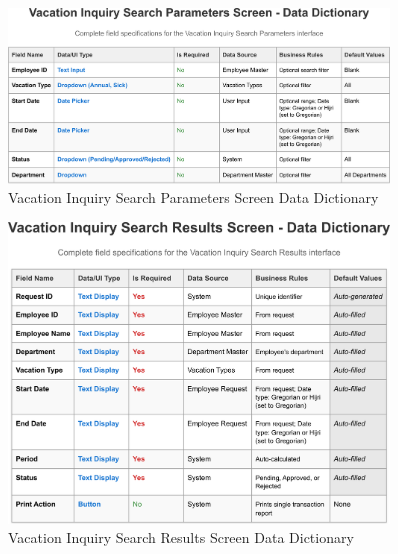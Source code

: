 \documentclass[12pt,a4paper]{article}
\begin{document}
\begin{figure}[H]
\centering
\includegraphics[width=0.9\textwidth]{Data-Dictionary/Screen-Data-Dictionaries/Vacation-Inquiry-Search-Parameters-Screen-Data-Dictionary/Vacation-Inquiry-Search-Parameters-Screen-Data-Dictionary-1.png}
\caption{Vacation Inquiry Search Parameters Screen Data Dictionary}
\label{fig:inquiry-search-params-data-dict}
\end{figure}

\begin{figure}[H]
\centering
\includegraphics[width=0.9\textwidth]{Data-Dictionary/Screen-Data-Dictionaries/Vacation-Inquiry-Search-Results-Screen-Data-Dictionary/Vacation-Inquiry-Search-Results-Screen-Data-Dictionary-1.png}
\caption{Vacation Inquiry Search Results Screen Data Dictionary}
\label{fig:inquiry-search-results-data-dict}
\end{figure}
\end{document}
